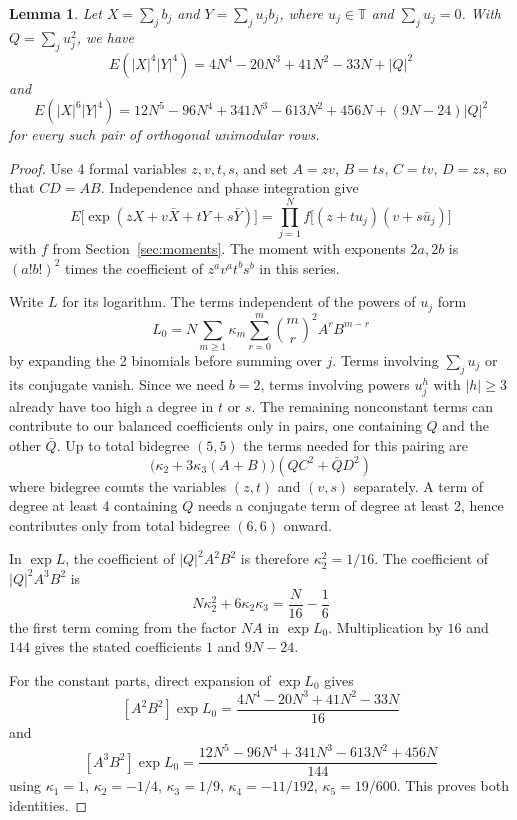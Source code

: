 \documentclass[11pt,a4paper]{article}
\newtheorem{lem}[thm]{Lemma}
\theoremstyle{remark}
\begin{document}
\begin{samepage}
\begin{lem}\label{lem:rowpairs}
Let $X=\sum_jb_j$ and $Y=\sum_ju_jb_j$, where $u_j\in\mathbb T$ and $\sum_ju_j=0$. With $Q=\sum_ju_j^2$, we have
\[
 E(|X|^4|Y|^4)
 =4N^4-20N^3+41N^2-33N+|Q|^2
\]
and
\[
 E(|X|^6|Y|^4)
 =12N^5-96N^4+341N^3-613N^2+456N+(9N-24)|Q|^2
\]
for every such pair of orthogonal unimodular rows.
\end{lem}
\end{samepage}
\begin{proof}
Use 4 formal variables $z,v,t,s$, and set $A=zv$, $B=ts$, $C=tv$, $D=zs$, so that $CD=AB$. Independence and phase integration give
\[
 E\big[\exp(zX+v\bar X+tY+s\bar Y)\big]
   =\prod_{j=1}^N f\big[(z+tu_j)(v+s\bar u_j)\big]
\]
with $f$ from Section~\ref{sec:moments}. The moment with exponents $2a,2b$ is $(a!b!)^2$ times the coefficient of $z^av^at^bs^b$ in this series.

Write $L$ for its logarithm. The terms independent of the powers of $u_j$ form
\[
 L_0=N\sum_{m\ge1}\kappa_m
            \sum_{r=0}^m\binom mr^2 A^rB^{m-r}
\]
by expanding the 2 binomials before summing over $j$. Terms involving $\sum_ju_j$ or its conjugate vanish. Since we need $b=2$, terms involving powers $u_j^h$ with $|h|\ge3$ already have too high a degree in $t$ or $s$. The remaining nonconstant terms can contribute to our balanced coefficients only in pairs, one containing $Q$ and the other $\bar Q$. Up to total bidegree $(5,5)$ the terms needed for this pairing are
\[
 \big(\kappa_2+3\kappa_3(A+B)\big)(QC^2+\bar QD^2)
\]
where bidegree counts the variables $(z,t)$ and $(v,s)$ separately. A term of degree at least 4 containing $Q$ needs a conjugate term of degree at least 2, hence contributes only from total bidegree $(6,6)$ onward.

In $\exp L$, the coefficient of $|Q|^2A^2B^2$ is therefore $\kappa_2^2=1/16$. The coefficient of $|Q|^2A^3B^2$ is
\[
 N\kappa_2^2+6\kappa_2\kappa_3=\frac{N}{16}-\frac16
\]
the first term coming from the factor $NA$ in $\exp L_0$. Multiplication by $16$ and $144$ gives the stated coefficients $1$ and $9N-24$.

For the constant parts, direct expansion of $\exp L_0$ gives
\[
 [A^2B^2]\exp L_0=\frac{4N^4-20N^3+41N^2-33N}{16}
\]
and
\[
 [A^3B^2]\exp L_0
   =\frac{12N^5-96N^4+341N^3-613N^2+456N}{144}
\]
using $\kappa_1=1$, $\kappa_2=-1/4$, $\kappa_3=1/9$, $\kappa_4=-11/192$, $\kappa_5=19/600$. This proves both identities.
\end{proof}
\end{document}
